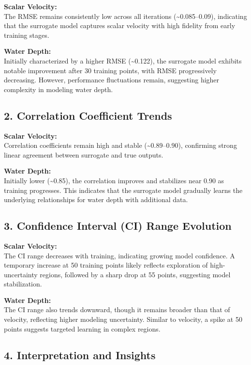 \documentclass[draft,linenumbers,onecolumn]{agujournal2019} %
\begin{document}
\textbf{Scalar Velocity:} \\
The RMSE remains consistently low across all iterations (\textasciitilde0.085–0.09), indicating that the surrogate model captures scalar velocity with high fidelity from early training stages.

\textbf{Water Depth:} \\
Initially characterized by a higher RMSE (\textasciitilde0.122), the surrogate model exhibits notable improvement after 30 training points, with RMSE progressively decreasing. However, performance fluctuations remain, suggesting higher complexity in modeling water depth.

\subsection*{2. Correlation Coefficient Trends}

\textbf{Scalar Velocity:} \\
Correlation coefficients remain high and stable (\textasciitilde0.89–0.90), confirming strong linear agreement between surrogate and true outputs.

\textbf{Water Depth:} \\
Initially lower (\textasciitilde0.85), the correlation improves and stabilizes near 0.90 as training progresses. This indicates that the surrogate model gradually learns the underlying relationships for water depth with additional data.

\subsection*{3. Confidence Interval (CI) Range Evolution}

\textbf{Scalar Velocity:} \\
The CI range decreases with training, indicating growing model confidence. A temporary increase at 50 training points likely reflects exploration of high-uncertainty regions, followed by a sharp drop at 55 points, suggesting model stabilization.

\textbf{Water Depth:} \\
The CI range also trends downward, though it remains broader than that of velocity, reflecting higher modeling uncertainty. Similar to velocity, a spike at 50 points suggests targeted learning in complex regions.

\subsection*{4. Interpretation and Insights}
\end{document}
